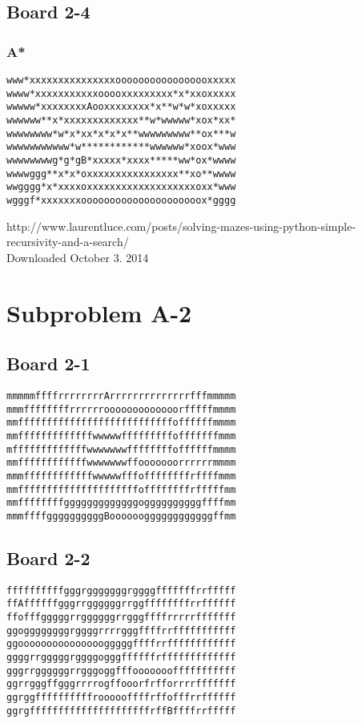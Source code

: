 \documentclass[11pt,a4paper]{article}
\begin{document}
\subsection*{Board 2-4}
\subsubsection*{A*}
\begin{lstlisting}
www*xxxxxxxxxxxxxxxooooooooooooooooxxxxx
wwww*xxxxxxxxxxxooooxxxxxxxxx*x*xxoxxxxx
wwwww*xxxxxxxxAooxxxxxxxx*x**w*w*xoxxxxx
wwwwww**x*xxxxxxxxxxxxx**w*wwwww*xox*xx*
wwwwwwww*w*x*xx*x*x*x**wwwwwwwww**ox***w
wwwwwwwwwww*w************wwwwww*xoox*www
wwwwwwwwg*g*gB*xxxxx*xxxx*****ww*ox*wwww
wwwwggg**x*x*oxxxxxxxxxxxxxxxx**xo**wwww
wwgggg*x*xxxxoxxxxxxxxxxxxxxxxxxxoxx*www
wgggf*xxxxxxxooooooooooooooooooooox*gggg
\end{lstlisting}

\begin{thebibliography}{9}

  http://www.laurentluce.com/posts/solving-mazes-using-python-simple-recursivity-and-a-search/
  \\ Downloaded October 3. 2014

\end{thebibliography}

\section*{Subproblem A-2}
\subsection*{Board 2-1}
\begin{lstlisting}
mmmmmffffrrrrrrrrArrrrrrrrrrrrrrfffmmmmm
mmmffffffffrrrrrrooooooooooooorfffffmmmm
mmfffffffffffffffffffffffffffoffffffmmmm
mmfffffffffffffwwwwwfffffffffofffffffmmm
mfffffffffffffwwwwwwwffffffffoffffffmmmm
mmffffffffffffwwwwwwwffooooooorrrrrrmmmm
mmmffffffffffffwwwwwfffoffffffffrffffmmm
mmfffffffffffffffffffffoffffffffrfffffmm
mmffffffffgggggggggggggoggggggggggffffmm
mmmffffggggggggggBooooooggggggggggggffmm
\end{lstlisting}

\subsection*{Board 2-2}
\begin{lstlisting}
ffffffffffgggrgggggggrggggfffffffrrfffff
ffAffffffgggrrggggggrrggffffffffrrffffff
ffofffgggggrrggggggrrgggffffrrrrrfffffff
ggoggggggggrggggrrrrgggffffrrfffffffffff
ggooooooooooooooogggggffffrrffffffffffff
ggggrrgggggrggggogggffffffrfffffffffffff
gggrrggggggrrgggoggfffooooooofffffffffff
ggrrgggffgggrrrrogffooorfrfforrrrfffffff
ggrggffffffffffroooooffffrffofffrrffffff
ggrgfffffffffffffffffffffrffBffffrrfffff
\end{lstlisting}
\end{document}
